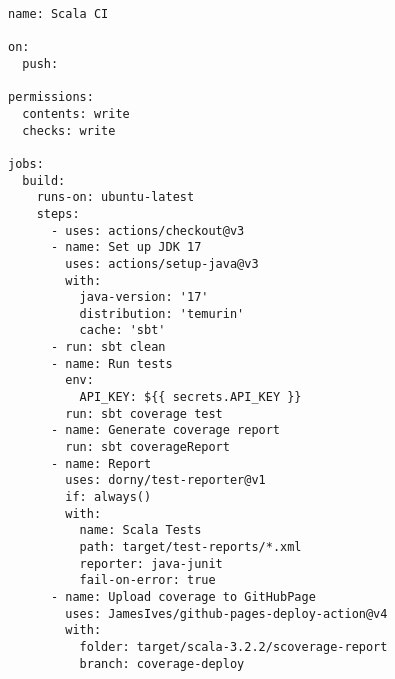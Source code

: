 \begin{verbatim}
name: Scala CI

on:
  push:

permissions:
  contents: write
  checks: write

jobs:
  build:
    runs-on: ubuntu-latest
    steps:
      - uses: actions/checkout@v3
      - name: Set up JDK 17
        uses: actions/setup-java@v3
        with:
          java-version: '17'
          distribution: 'temurin'
          cache: 'sbt'
      - run: sbt clean
      - name: Run tests
        env:
          API_KEY: ${{ secrets.API_KEY }}
        run: sbt coverage test
      - name: Generate coverage report
        run: sbt coverageReport
      - name: Report
        uses: dorny/test-reporter@v1
        if: always()
        with:
          name: Scala Tests
          path: target/test-reports/*.xml
          reporter: java-junit
          fail-on-error: true
      - name: Upload coverage to GitHubPage
        uses: JamesIves/github-pages-deploy-action@v4
        with:
          folder: target/scala-3.2.2/scoverage-report
          branch: coverage-deploy 

\end{verbatim}
